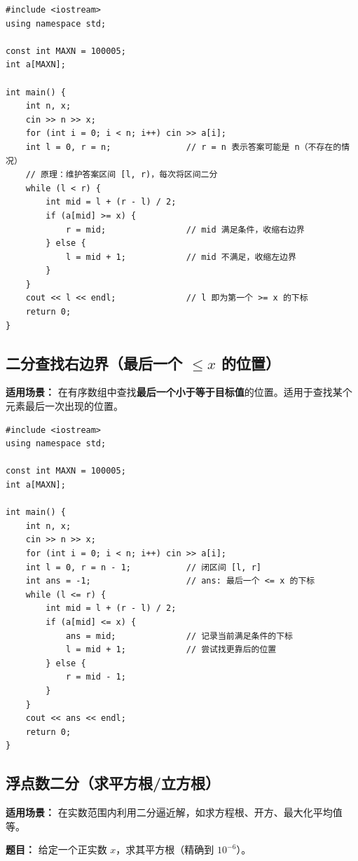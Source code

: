 \documentclass[12pt,a4paper]{ctexart}
\begin{document}
\begin{lstlisting}[caption={二分查找——第一个大于等于 x 的位置（lower\_bound）}]
#include <iostream>
using namespace std;

const int MAXN = 100005;
int a[MAXN];

int main() {
    int n, x;
    cin >> n >> x;
    for (int i = 0; i < n; i++) cin >> a[i];
    int l = 0, r = n;               // r = n 表示答案可能是 n（不存在的情况）
    // 原理：维护答案区间 [l, r)，每次将区间二分
    while (l < r) {
        int mid = l + (r - l) / 2;
        if (a[mid] >= x) {
            r = mid;                // mid 满足条件，收缩右边界
        } else {
            l = mid + 1;            // mid 不满足，收缩左边界
        }
    }
    cout << l << endl;              // l 即为第一个 >= x 的下标
    return 0;
}
\end{lstlisting}

\subsection{二分查找右边界（最后一个 $\le x$ 的位置）}
\textbf{适用场景：} 在有序数组中查找\textbf{最后一个小于等于目标值}的位置。适用于查找某个元素最后一次出现的位置。

\begin{lstlisting}[caption={二分查找——最后一个小于等于 x 的位置}]
#include <iostream>
using namespace std;

const int MAXN = 100005;
int a[MAXN];

int main() {
    int n, x;
    cin >> n >> x;
    for (int i = 0; i < n; i++) cin >> a[i];
    int l = 0, r = n - 1;           // 闭区间 [l, r]
    int ans = -1;                   // ans: 最后一个 <= x 的下标
    while (l <= r) {
        int mid = l + (r - l) / 2;
        if (a[mid] <= x) {
            ans = mid;              // 记录当前满足条件的下标
            l = mid + 1;            // 尝试找更靠后的位置
        } else {
            r = mid - 1;
        }
    }
    cout << ans << endl;
    return 0;
}
\end{lstlisting}

\subsection{浮点数二分（求平方根/立方根）}
\textbf{适用场景：} 在实数范围内利用二分逼近解，如求方程根、开方、最大化平均值等。

\textbf{题目：} 给定一个正实数 $x$，求其平方根（精确到 $10^{-6}$）。
\end{document}
